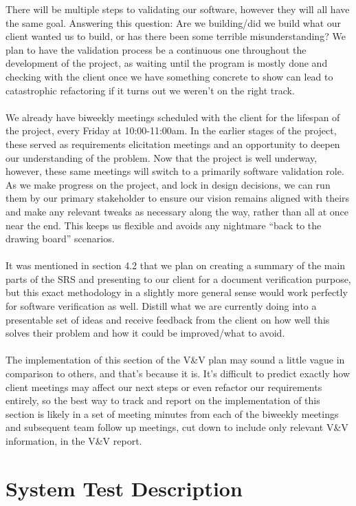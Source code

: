 \documentclass[12pt, titlepage]{article}
\begin{document}
There will be multiple steps to validating our software, however they will all have the same goal. Answering this question: Are we building/did we build what our client wanted
us to build, or has there been some terrible misunderstanding? We plan to have the validation
process be a continuous one throughout the development of the project, as waiting until the program is mostly done and checking with the client once we have 
something concrete to show can lead to catastrophic refactoring if it turns out we weren’t on the right track.\\\\ We already have biweekly meetings
scheduled with the client for the lifespan of the project, every Friday at 10:00-11:00am. In the earlier stages of the project, these served as requirements elicitation
meetings and an opportunity to deepen our understanding of the problem. Now that the project is well underway, however, these same meetings will switch to a primarily software
validation role. As we make progress on the project, and lock in design decisions, we can run them by our primary stakeholder to ensure our vision remains aligned with theirs
and make any relevant tweaks as necessary along the way, rather than all at once near the end. This keeps us flexible and avoids any nightmare “back to the drawing board” 
scenarios.\\\\ It was mentioned in section 4.2 that we plan on creating a summary of the main parts of the SRS and presenting to our client for a document verification purpose,
but this exact methodology in a slightly more general sense would work perfectly for software verification as well. Distill what we are currently doing into a presentable
set of ideas and receive feedback from the client on how well this solves their problem and how it could be improved/what to avoid.\\\\ The implementation of this
section of the V\&V plan may sound a little vague in comparison to others, and that’s because it is. It’s difficult to predict exactly how client meetings may affect our
next steps or even refactor our requirements entirely, so the best way to track and report on the implementation of this section is likely in a set of meeting minutes
from each of the biweekly meetings and subsequent team follow up meetings, cut down to include only relevant V\&V information, in the V\&V report.

\section{System Test Description}
	
\end{document}
